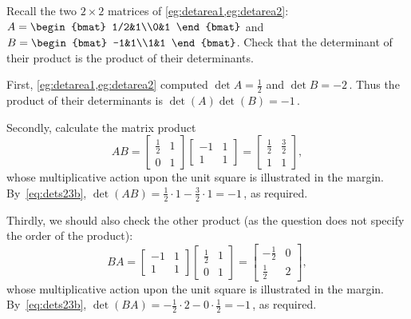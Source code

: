 \begin{example} 
Recall the two \(2\times2\) matrices of \cref{eg:detarea1,eg:detarea2}:
\(A=\begin{bmat} 1/2&1\\0&1 \end{bmat}\) and
\(B=\begin{bmat} -1&1\\1&1 \end{bmat}\).
Check that the determinant of their product is the product of their determinants. 
\begin{solution} 
First, \cref{eg:detarea1,eg:detarea2} computed \(\det A=\tfrac12\) and \(\det B=-2\)\,.
Thus the product of their determinants is \(\det(A)\det(B)=-1\)\,.

Secondly, calculate the matrix product
%
\begin{equation*}
AB=\begin{bmatrix} \tfrac12&1\\0&1 \end{bmatrix}
\begin{bmatrix} -1&1\\1&1 \end{bmatrix}
=\begin{bmatrix} \tfrac12&\tfrac32\\1&1 \end{bmatrix},
\end{equation*}
whose multiplicative action upon the unit square is illustrated in the margin.
By~\eqref{eq:dets23b}, \(\det(AB)=\frac12\cdot1-\frac32\cdot1=-1\)\,, as required.
 
Thirdly, we should also check the other product (as the question does not specify the order of the product):
%
\begin{equation*}
BA=\begin{bmatrix} -1&1\\1&1 \end{bmatrix}
\begin{bmatrix} \tfrac12&1\\0&1 \end{bmatrix}
=\begin{bmatrix} -\tfrac12&0\\\tfrac12&2 \end{bmatrix},
\end{equation*}
whose multiplicative action upon the unit square is illustrated in the margin.
By~\eqref{eq:dets23b}, \(\det(BA)=-\frac12\cdot2-0\cdot\frac12=-1\)\,, as required.
\end{solution}
\end{example}



